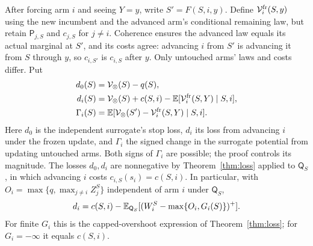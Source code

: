 After forcing arm $i$ and seeing $Y=y$, write $S'=F(S,i,y)$. Define
$\mathcal V_i^{\rm fr}(S,y)$ using the new incumbent and the advanced arm's
conditional remaining law, but retain $\mathsf P_{j,S}$ and $c_{j,S}$ for $j\ne i$. Coherence
ensures the advanced law equals its actual marginal at $S'$, and its costs agree: advancing $i$
from $S'$ is advancing it from $S$ through $y$, so $c_{i,S'}$ is $c_{i,S}$ after $y$. Only
untouched arms' laws and costs differ.
Put
\begin{align}
 d_0(S)&=\mathcal V_\otimes(S)-q(S),\nonumber\\
 d_i(S)&=\mathcal V_\otimes(S)+c(S,i)-\mathbb{E}[\mathcal V_i^{\rm fr}(S,Y)\mid S,i],\nonumber\\
 \Gamma_i(S)&=\mathbb{E}[\mathcal V_\otimes(S')-\mathcal V_i^{\rm fr}(S,Y)\mid S,i].
 \label{eq:sharing-gamma}
\end{align}
Here $d_0$ is the independent surrogate's stop loss, $d_i$ its loss from
advancing $i$ under the frozen update, and $\Gamma_i$ the signed change in
the surrogate potential from updating untouched arms. Both signs of $\Gamma_i$
are possible; the proof controls its magnitude.
The losses $d_0,d_i$ are nonnegative by Theorem~\ref{thm:loss} applied to
$\mathsf Q_S$, in which advancing $i$ costs $c_{i,S}(s_i)=c(S,i)$. In particular, with
$O_i=\max\{q,\max_{j\ne i}Z_j^S\}$ independent of arm $i$ under $\mathsf Q_S$,
\[
 d_i=c(S,i)-\mathbb{E}_{\mathsf Q_S}[(W_i^S-\max\{O_i,G_i(S)\})^+].
\]
For finite $G_i$ this is the capped-overshoot expression of Theorem~\ref{thm:loss};
for $G_i=-\infty$ it equals $c(S,i)$.


